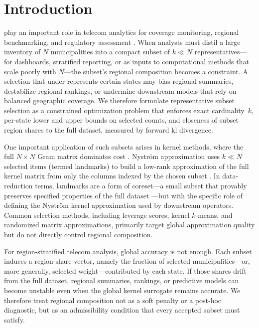 \documentclass[10pt,journal]{IEEEtran}
\newcommand{\1}{\mathbf{1}}
\theoremstyle{ieeethm}
\begin{document}
\section{Introduction}
\label{sec:intro}

 play an important role in telecom analytics for coverage monitoring, regional benchmarking, and regulatory assessment \cite{mohammadjafari2020coverage,weedage2024resilience}. When analysts must distil a large inventory of $N$ municipalities into a compact subset of $k\!\ll\!N$ representatives---for dashboards, stratified reporting, or as inputs to computational methods that scale poorly with $N$---the subset's regional composition becomes a constraint. A selection that under-represents certain states may bias regional summaries, destabilize regional rankings, or undermine downstream models that rely on balanced geographic coverage. We therefore formulate representative subset selection as a constrained optimization problem that enforces exact cardinality~$k$, per-state lower and upper bounds on selected counts, and closeness of subset region shares to the full dataset, measured by forward \gls{kl} divergence.

One important application of such subsets arises in kernel methods, where the full $N\!\times\!N$ Gram matrix dominates cost \cite{scholkopf2002learning,liu2010kaf,engel2004krls}. Nystr\"{o}m approximation uses $k\!\ll\!N$ selected items (termed landmarks) to build a low-rank approximation of the full kernel matrix from only the columns indexed by the chosen subset \cite{williams2001nystrom,gittens2016nystrom}. In data-reduction terms, landmarks are a form of coreset---a small subset that provably preserves specified properties of the full dataset \cite{phillips2016coresets,feldman2020coresets}---but with the specific role of defining the Nystr\"{o}m kernel approximation used by downstream operators. Common selection methods, including leverage scores, kernel $k$-means, and randomized matrix approximations, primarily target global approximation quality \cite{natoleverage2011,alaoui2015rr,he_zhang_2018,Li_Bi_Kwok_2015} but do not directly control regional composition.

For region-stratified telecom analysis, global accuracy is not enough. Each subset induces a region-share vector, namely the fraction of selected municipalities---or, more generally, selected weight---contributed by each state. If those shares drift from the full dataset, regional summaries, rankings, or predictive models can become unstable even when the global kernel surrogate remains accurate. We therefore treat regional composition not as a soft penalty or a post-hoc diagnostic, but as an admissibility condition that every accepted subset must satisfy.
\end{document}
